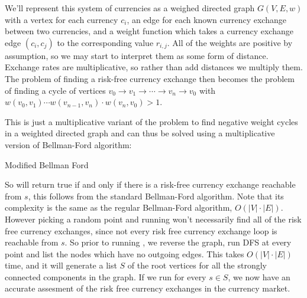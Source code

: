 \documentclass[11pt,letterpaper]{article}
\begin{document}
\begin{solution}
    We'll represent this system of currencies as a weighed directed graph $G(V,E,w)$ with a vertex for each currency $c_i$, an edge for each known currency exchange between two currencies, and a weight function which takes a currency exchange edge $(c_i, c_j)$ to the corresponding value $r_{i,j}$. All of the weights are positive by assumption, so we may start to interpret them as some form of distance. Exchange rates are multiplicative, so rather than add distances we multiply them. The problem of finding a risk-free currency exchange then becomes the problem of finding a cycle of vertices $v_0\to v_1\to\cdots\to v_n\to v_0$ with $w(v_0, v_1)\cdots w(v_{n-1},v_n) \cdot w(v_n, v_0) > 1$.
    
    This is just a multiplicative variant of the problem to find negative weight cycles in a weighted directed graph and can thus be solved using a multiplicative version of Bellman-Ford algorithm: 

    \begin{algorithm}
    \caption{Modified Bellman Ford}
    \DontPrintSemicolon
    
    \end{algorithm}
    
    So  will return true if and only if there is a risk-free currency exchange reachable from $s$, this follows from the standard Bellman-Ford algorithm. Note that its complexity is the same as the regular Bellman-Ford algorithm, $O(|V|\cdot |E|)$. However picking a random point and running  won't necessarily find all of the risk free currency exchanges, since not every risk free currency exchange loop is reachable from $s$. So prior to running , we reverse the graph, run DFS at every point and list the nodes which have no outgoing edges. This takes $O(|V|\cdot |E|)$ time, and it will generate a list $S$ of the root vertices for all the strongly connected components in the graph. If we run  for every $s\in S$, we now have an accurate assesment of the risk free currency exchanges in the currency market.
\end{solution}
\end{document}
